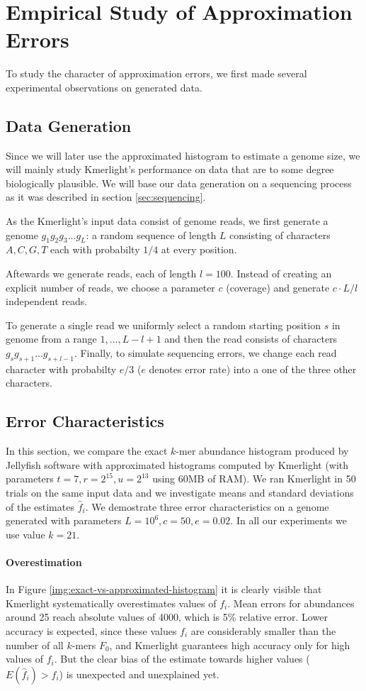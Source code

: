 \section{Empirical Study of Approximation Errors}
To study the character of approximation errors, we first made several experimental
observations on generated data.

\subsection{Data Generation}
\label{sec:data-generation}
Since we will later use the approximated histogram to estimate a genome size, 
we will mainly study Kmerlight's performance on data that are to some
degree biologically plausible. We will base our data generation on a sequencing
process as it was described in section \ref{sec:sequencing}.

As the Kmerlight's input data consist of genome reads, we first generate a genome 
$g_1g_2g_3 \dots g_L$: a random sequence of length $L$ consisting of characters $A, C, G, T$ 
each with probabilty $1/4$ at every position.

Aftewards we generate reads, each of length $l=100$. Instead of creating an explicit number
of reads, we choose a parameter $c$ (coverage) and generate $c \cdot L / l$ independent reads.

To generate a single read we uniformly select a random starting position $s$ in genome from
a range $1, \dots, L - l + 1$ and then the read consists of characters
$g_s g_{s+1} \dots g_{s+l-1}$. Finally, to simulate sequencing errors, we change each read
character with probabilty $e/3$ ($e$ denotes error rate) into a one of the three other characters.


\subsection{Error Characteristics}
\label{sec:error-characteristics}
In this section, we compare the exact $k$-mer abundance histogram produced by Jellyfish software
\cite{Marcais2011}
with approximated histograms computed by Kmerlight (with parameters $t=7, r=2^{15}, u=2^{13}$ using
60MB of RAM). We ran Kmerlight in 50 trials on the same input data and we investigate means and
standard deviations of the estimates $\hat f_i$. We demostrate three error characteristics
on a genome generated with parameters $L=10^6, c=50, e=0.02$. In all our experiments we
use value $k=21$.

\paragraph{Overestimation}
In Figure \ref{img:exact-vs-approximated-histogram} it is clearly visible that Kmerlight
systematically overestimates values of $f_i$. Mean errors for abundances around 25 reach
absolute values of 4000, which is 5\% relative error. Lower accuracy is expected, since these values
$f_i$ are considerably smaller than the number of all $k$-mers $F_0$, and Kmerlight guarantees
high accuracy only for high values of $f_i$. But the clear bias of the estimate towards higher
values ($E(\hat f_i) > f_i$) is unexpected and unexplained yet.  

